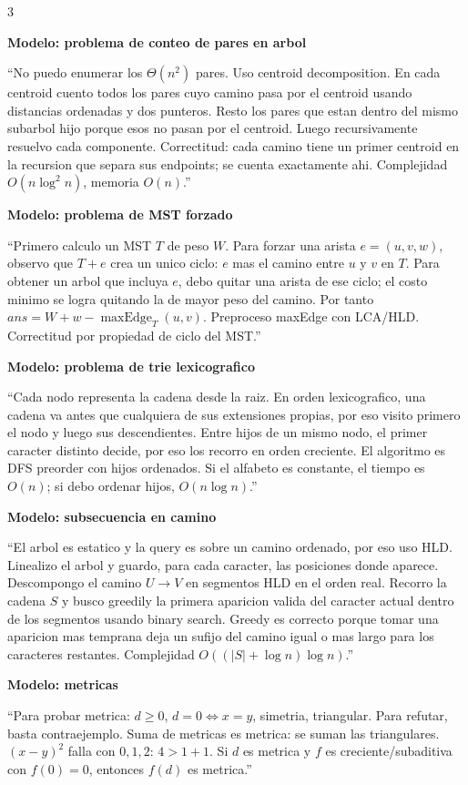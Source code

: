 \documentclass[8pt]{extarticle}
\newcommand{\blk}[2]{%
  \vspace{1.3pt}
  \noindent\colorbox{head}{\parbox{\linewidth-2\fboxsep}{\textbf{#1}}}\par
  {\footnotesize #2}\par
}
\newcommand{\bigO}{O}
\begin{document}
\begin{multicols}{3}
\blk{Modelo: problema de conteo de pares en arbol}{
``No puedo enumerar los \(\Theta(n^2)\) pares. Uso centroid decomposition. En cada centroid cuento todos los pares cuyo camino pasa por el centroid usando distancias ordenadas y dos punteros. Resto los pares que estan dentro del mismo subarbol hijo porque esos no pasan por el centroid. Luego recursivamente resuelvo cada componente. Correctitud: cada camino tiene un primer centroid en la recursion que separa sus endpoints; se cuenta exactamente ahi. Complejidad \(\bigO(n\log^2 n)\), memoria \(\bigO(n)\).''}

\blk{Modelo: problema de MST forzado}{
``Primero calculo un MST \(T\) de peso \(W\). Para forzar una arista \(e=(u,v,w)\), observo que \(T+e\) crea un unico ciclo: \(e\) mas el camino entre \(u\) y \(v\) en \(T\). Para obtener un arbol que incluya \(e\), debo quitar una arista de ese ciclo; el costo minimo se logra quitando la de mayor peso del camino. Por tanto \(ans=W+w-\operatorname{maxEdge}_T(u,v)\). Preproceso maxEdge con LCA/HLD. Correctitud por propiedad de ciclo del MST.''}

\blk{Modelo: problema de trie lexicografico}{
``Cada nodo representa la cadena desde la raiz. En orden lexicografico, una cadena va antes que cualquiera de sus extensiones propias, por eso visito primero el nodo y luego sus descendientes. Entre hijos de un mismo nodo, el primer caracter distinto decide, por eso los recorro en orden creciente. El algoritmo es DFS preorder con hijos ordenados. Si el alfabeto es constante, el tiempo es \(\bigO(n)\); si debo ordenar hijos, \(\bigO(n\log n)\).''}

\blk{Modelo: subsecuencia en camino}{
``El arbol es estatico y la query es sobre un camino ordenado, por eso uso HLD. Linealizo el arbol y guardo, para cada caracter, las posiciones donde aparece. Descompongo el camino \(U\to V\) en segmentos HLD en el orden real. Recorro la cadena \(S\) y busco greedily la primera aparicion valida del caracter actual dentro de los segmentos usando binary search. Greedy es correcto porque tomar una aparicion mas temprana deja un sufijo del camino igual o mas largo para los caracteres restantes. Complejidad \(\bigO((|S|+\log n)\log n)\).''}

\blk{Modelo: metricas}{
``Para probar metrica: \(d\ge0\), \(d=0\Leftrightarrow x=y\), simetria, triangular. Para refutar, basta contraejemplo. Suma de metricas es metrica: se suman las triangulares. \((x-y)^2\) falla con \(0,1,2\): \(4>1+1\). Si \(d\) es metrica y \(f\) es creciente/subaditiva con \(f(0)=0\), entonces \(f(d)\) es metrica.''}


\end{multicols}
\end{document}
